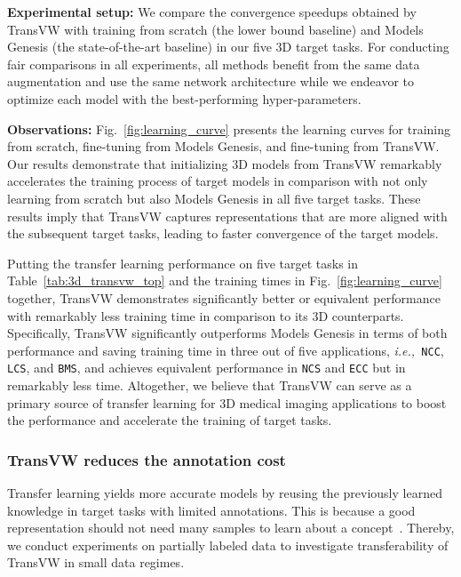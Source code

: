 \documentclass[journal,twoside,web]{ieeecolor}
\def\figurename{Fig.}
\def\tablename{Table}
\newcommand{\ie}{\mbox{\emph{i.e.,\ }}}
\begin{document}
\smallskip
\noindent\textbf{Experimental setup:} We compare the convergence speedups obtained by TransVW 
with training from scratch (the lower bound baseline) and Models Genesis (the state-of-the-art baseline) in our five 3D target tasks.  For conducting fair comparisons in all experiments,  all methods benefit from the same data augmentation and use the same  network architecture while we endeavor to optimize each model with the best-performing hyper-parameters. 

\smallskip
\noindent\textbf{Observations:} 
\figurename~\ref{fig:learning_curve} presents the learning curves for training from scratch, fine-tuning from Models Genesis, and fine-tuning from TransVW.  Our results demonstrate that initializing 3D models from TransVW  remarkably accelerates the training process of target models in comparison with not only learning from scratch but also Models Genesis in all five target tasks.  
These results imply that  
 TransVW captures  representations  that are more aligned with the subsequent target tasks, leading to faster convergence of the target models. 
 
Putting the transfer learning performance on five target tasks in \tablename~\ref{tab:3d_transvw_top} and the training times in \figurename~\ref{fig:learning_curve} together,  TransVW demonstrates  significantly  better  or  equivalent  performance  with  remarkably  less  training  time  in  comparison  to  its  3D counterparts.
Specifically, TransVW significantly outperforms Models Genesis in terms of both performance and saving training time in three out of five applications, \ie \texttt{NCC}, \texttt{LCS}, and \texttt{BMS}, and achieves equivalent performance in  \texttt{NCS} and \texttt{ECC} but in remarkably less time. 
 Altogether,  we believe that TransVW can serve as a primary source of transfer learning for 3D medical imaging applications to boost the performance and accelerate the training of target tasks. 




\subsubsection{TransVW reduces the annotation cost} 
\label{sec:result_annot_effic_annot_cost}
Transfer learning  yields more accurate models by reusing the previously learned knowledge in target tasks with limited annotations.  
This is because a good representation should not need many samples to learn about a concept~\cite{goyal2019scaling}. 
Thereby, we conduct experiments on partially labeled data to  investigate transferability of TransVW in small data regimes.
\end{document}
